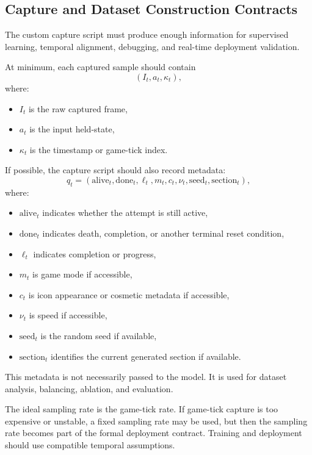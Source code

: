 \documentclass[11pt]{article}
\begin{document}
\subsection{Capture and Dataset Construction Contracts}

The custom capture script must produce enough information for supervised learning, temporal alignment, debugging, and real-time deployment validation.

At minimum, each captured sample should contain
\[
  (I_t, a_t, \kappa_t),
\]
where:
\begin{itemize}
  \item \(I_t\) is the raw captured frame,
  \item \(a_t\) is the input held-state,
  \item \(\kappa_t\) is the timestamp or game-tick index.
\end{itemize}

If possible, the capture script should also record metadata:
\[
  q_t = (\mathrm{alive}_t, \mathrm{done}_t, \ell_t, m_t, c_t, \nu_t, \mathrm{seed}_t, \mathrm{section}_t),
\]
where:
\begin{itemize}
  \item \(\mathrm{alive}_t\) indicates whether the attempt is still active,
  \item \(\mathrm{done}_t\) indicates death, completion, or another terminal reset condition,
  \item \(\ell_t\) indicates completion or progress,
  \item \(m_t\) is game mode if accessible,
  \item \(c_t\) is icon appearance or cosmetic metadata if accessible,
  \item \(\nu_t\) is speed if accessible,
  \item \(\mathrm{seed}_t\) is the random seed if available,
  \item \(\mathrm{section}_t\) identifies the current generated section if available.
\end{itemize}

This metadata is not necessarily passed to the model. It is used for dataset analysis, balancing, ablation, and evaluation.

The ideal sampling rate is the game-tick rate. If game-tick capture is too expensive or unstable, a fixed sampling rate may be used, but then the sampling rate becomes part of the formal deployment contract. Training and deployment should use compatible temporal assumptions.
\end{document}
